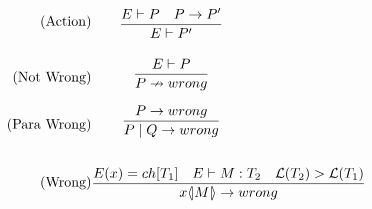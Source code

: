 
\begin{align*}
\tag{Action} & \infrule{E \vdash P \quad P\ra P'}{E\vdash P'}\\
\tag{Not Wrong}& \infrule{E \vdash P}{P \nrightarrow wrong}\\
\tag{Para Wrong}& \infrule{P \ra wrong}{P\para Q \ra wrong}\\
\tag{Wrong}& \infrule{E(x) = ch[T_1] \quad E \vdash M:T_2 \quad \level{T_2} > \level{T_1} }{\lift{x}{M} \ra wrong}
\end{align*}


%
%

\FloatBarrier
